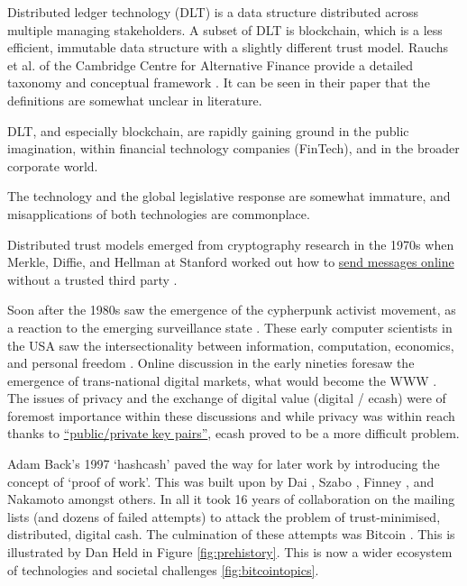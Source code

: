 Distributed ledger technology (DLT) is a data structure distributed across multiple managing stakeholders. A subset of DLT is blockchain, which is a less efficient, immutable data structure with a slightly different trust model. Rauchs et al. of the Cambridge Centre for Alternative Finance provide a detailed taxonomy and conceptual framework \cite{rauchs2018distributed}. It can be seen in their paper that the definitions are somewhat unclear in literature.\par
DLT, and especially blockchain, are rapidly gaining ground in the public imagination, within financial technology companies (FinTech), and in the broader corporate world. \par
The technology and the global legislative response are somewhat immature, and misapplications of both technologies are commonplace. \par
Distributed trust models emerged from cryptography research in the 1970s when Merkle, Diffie, and Hellman at Stanford worked out how to \href{https://medium.com/swlh/understanding-ec-diffie-hellman-9c07be338d4a}{send messages online} without a trusted third party \cite{diffie1976new,merkle1978secure}.\par
Soon after the 1980s saw the emergence of the cypherpunk activist movement, as a reaction to the emerging surveillance state \cite{burnham1983rise, chaum1985security}. These early computer scientists in the USA saw the intersectionality between information, computation, economics, and personal freedom \cite{lavoie1990prefatory}. Online discussion in the early nineties foresaw the emergence of trans-national digital markets, what would become the WWW \cite{salinCosts, cypherPunkMailList}. The issues of privacy %
 and the exchange of digital value (digital / ecash) %
 were of foremost importance within these discussions %
 and while privacy was within reach thanks to \href{https://www.openpgp.org/about/history/}{``public/private key pairs''}, 
 ecash proved to be a more difficult problem. \par
Adam Back's 1997 `hashcash' \cite{back2002hashcash} paved the way for later work by introducing the concept of `proof of work'. This was built upon by Dai \cite{dai1998b}, Szabo \cite{szabo1997formalizing}, Finney \cite{callas1998openpgp}, and Nakamoto amongst others. In all it took 16 years of collaboration on the mailing lists (and dozens of failed attempts) to attack the problem of trust-minimised, distributed, digital cash. The culmination of these attempts was Bitcoin \cite{Nakamoto2008}. This is illustrated by Dan Held in Figure \ref{fig:prehistory}. This is now a wider ecosystem of technologies and societal challenges \ref{fig:bitcointopics}. 


